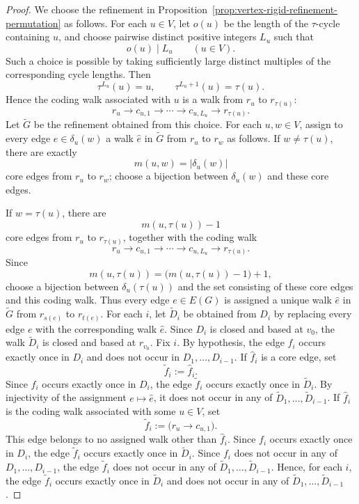 \documentclass[10pt,a4paper]{amsart}
\begin{document}
\begin{proof}
We choose the refinement in
Proposition~\ref{prop:vertex-rigid-refinement-permutation}
as follows. For each $u\in V$, let $o(u)$ be the length of the
$\tau$-cycle containing $u$, and choose pairwise distinct positive
integers $L_u$ such that
\[
o(u)\mid L_u
\qquad (u\in V).
\]
Such a choice is possible by taking sufficiently large distinct
multiples of the corresponding cycle lengths. Then
\[
\tau^{L_u}(u)=u,
\qquad
\tau^{L_u+1}(u)=\tau(u).
\]
Hence the coding walk associated with $u$ is a walk from $r_u$ to
$r_{\tau(u)}$:
\[
r_u\longrightarrow c_{u,1}\longrightarrow\cdots
\longrightarrow c_{u,L_u}\longrightarrow r_{\tau(u)}.
\]
Let $\widetilde G$ be the refinement obtained from this choice. For each $u,w\in V$, assign to every edge $e\in\delta_u(w)$ a walk
$\widehat e$ in $\widetilde G$ from $r_u$ to $r_w$ as follows. If $w\neq\tau(u)$, there are exactly
\[
m(u,w)=|\delta_u(w)|
\]
core edges from $r_u$ to $r_w$; choose a bijection between
$\delta_u(w)$ and these core edges.

If $w=\tau(u)$, there are
\[
m(u,\tau(u))-1
\]
core edges from $r_u$ to $r_{\tau(u)}$, together with the coding walk
\[
r_u\longrightarrow c_{u,1}\longrightarrow\cdots
\longrightarrow c_{u,L_u}\longrightarrow r_{\tau(u)}.
\]
Since
\[
m(u,\tau(u))
=
\bigl(m(u,\tau(u))-1\bigr)+1,
\]
choose a bijection between $\delta_u(\tau(u))$ and the set consisting
of these core edges and this coding walk.
Thus every edge $e\in E(G)$ is assigned a unique walk $\widehat e$ in
$\widetilde G$ from $r_{s(e)}$ to $r_{t(e)}$. For each $i$, let
$\widetilde D_i$ be obtained from $D_i$ by replacing every edge $e$
with the corresponding walk $\widehat e$. Since $D_i$ is closed and
based at $v_0$, the walk $\widetilde D_i$ is closed and based at
$r_{v_0}$.
Fix $i$. By hypothesis, the edge $f_i$ occurs exactly once in $D_i$
and does not occur in $D_1,\dots,D_{i-1}$. If $\widehat f_i$ is a core edge, set
\[
\widetilde f_i:=\widehat f_i.
\]
Since $f_i$ occurs exactly once in $D_i$, the edge
$\widetilde f_i$ occurs exactly once in $\widetilde D_i$.
By injectivity of the assignment $e\mapsto\widehat e$, it does not
occur in any of $\widetilde D_1,\dots,\widetilde D_{i-1}$.
If $\widehat f_i$ is the coding walk associated with some $u\in V$, set
\[
\widetilde f_i:=
\bigl(r_u\longrightarrow c_{u,1}\bigr).
\]
This edge belongs to no assigned walk other than $\widehat f_i$.
Since $f_i$ occurs exactly once in $D_i$, the edge
$\widetilde f_i$ occurs exactly once in $\widetilde D_i$.
Since $f_i$ does not occur in any of $D_1,\dots,D_{i-1}$,
the edge $\widetilde f_i$ does not occur in any of
$\widetilde D_1,\dots,\widetilde D_{i-1}$. Hence, for each $i$, the edge $\widetilde f_i$ occurs exactly once in $\widetilde D_i$ and does not occur in any of $\widetilde D_1,\dots,\widetilde D_{i-1}$.
\end{proof}
\end{document}
